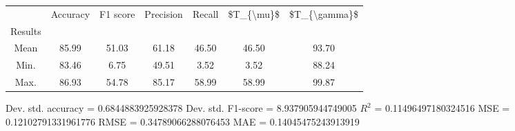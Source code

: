 \begin{tabular}{|c|c|c|c|c|c|c|}
\toprule
{} &  Accuracy &  F1 score &  Precision &  Recall &  \$T\_\{\textbackslash mu\}\$ &  \$T\_\{\textbackslash gamma\}\$ \\
Results &           &           &            &         &            &               \\
\hline
Mean    &     85.99 &     51.03 &      61.18 &   46.50 &      46.50 &         93.70 \\
Min.    &     83.46 &      6.75 &      49.51 &    3.52 &       3.52 &         88.24 \\
Max.    &     86.93 &     54.78 &      85.17 &   58.99 &      58.99 &         99.87 \\
\bottomrule
\end{tabular}

 Dev. std. accuracy = 0.6844883925928378
 Dev. std. F1-score = 8.937905944749005
 $R^2$ = 0.11496497180324516
 MSE = 0.12102791331961776
 RMSE = 0.34789066288076453
 MAE = 0.14045475243913919